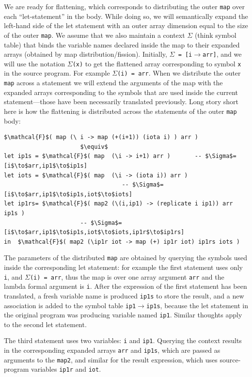 \documentclass[acmsmall,review]{acmart}\settopmatter{printfolios=true,printccs=false,printacmref=false}
\begin{document}
We are ready for flattening, which corresponds to distributing the
outer \lstinline{map} over each ``let-statement'' in the body.
While doing so, we will semantically expand the left-hand side
of the let statement with an outer array dimension equal to the
size of the outer \lstinline{map}. We assume that we also maintain
a context $\Sigma$ (think symbol table) that binds the variable
names declared inside the map to their expanded arrays (obtained 
by map distribution/fission).  Initially, {\tt $\Sigma$ = [i$\to$arr]},
and we will use the notation {\tt$\Sigma$(x)} to get the flattened
array corresponding to symbol {\tt x} in the source program. For example 
{\tt $\Sigma$(i) = arr}.  When we distribute the outer \lstinline{map}
across a statement we will extend the arguments of the map with
the expanded arrays corresponding to the symbols that are used inside
the current statement---those have been necessarily translated 
previously. Long story short here is how the flattening is
distributed across the statements of the outer \lstinline{map} body:
\begin{lstlisting}[mathescape=true]
$\mathcal{F}$( map (\ i -> map (+(i+1)) (iota i) ) arr ) 
                      $\equiv$
let ip1s = $\mathcal{F}$( map  (\i -> i+1) arr )       -- $\Sigma$=[i$\to$arr,ip1$\to$ip1s]
let iots = $\mathcal{F}$( map  (\i -> (iota i)) arr )  
                                  -- $\Sigma$=[i$\to$arr,ip1$\to$ip1s,iot$\to$iots]
let ip1rs= $\mathcal{F}$( map2 (\(i,ip1) -> (replicate i ip1)) arr ip1s )
                      -- $\Sigma$=[i$\to$arr,ip1$\to$ip1s,iot$\to$iots,ip1r$\to$ip1rs]
in  $\mathcal{F}$( map2 (\ip1r iot -> map (+) ip1r iot) ip1rs iots ) 
\end{lstlisting}\vspace{-2ex}
The parameters of the distributed \lstinline{map} are obtained by querying
the symbols used inside the corresponding let statement: for example the first
statement uses only {\tt i}, and {\tt$\Sigma$(i) = arr}, thus the map is over
one array argument {\tt arr} and the lambda formal argument is {\tt i}.
After the expression of the first statement has been translated, a fresh
variable name is produced {\tt ip1s} to store the result, and a new association
is added to the symbol table {\tt ip1$\to$ip1s}, because the let statement in the
original program was producing variable named {\tt ip1}.
Similar thoughts apply to the second let statement. 

The third statement uses two variables: {\tt i} and {\tt ip1}. Querying the
context results in the corresponding expanded arrays {\tt arr} and {\tt ip1s},
which are passed as arguments to the \lstinline{map2}, and similar for the
result expression, which uses source-program variables {\tt ip1r} and {\tt iot}.
\end{document}
